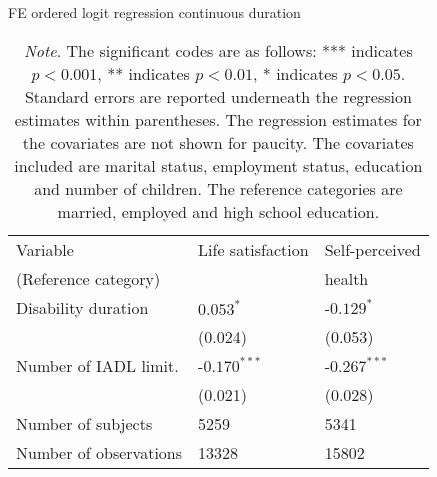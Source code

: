 \documentclass[12pt]{article}
\begin{document}
\begin{table}[htbp]
\centering
\footnotesize
\caption{FE ordered logit regression continuous duration}
\label{robust2}
\begin{tabular}{l ll}
\hline
Variable & Life satisfaction & Self-perceived \\
(Reference category) &  & health\\\hline\hline
\rule{0pt}{3ex}Disability duration      &  $0.053^{*}$   & -$0.129^{*}$     \\
                                        &  (0.024)       &  (0.053)         \\
\rule{0pt}{3ex}Number of IADL limit.    & -$0.170^{***}$ & -$0.267^{***}$   \\
                                        &  (0.021)       &  (0.028)         \\
\rule{0pt}{3ex}Number of subjects       &  5259          &  5341            \\
Number of observations                  &  13328         &  15802           \\
\hline
\end{tabular}
\caption*{\footnotesize{\textit{Note}. The significant codes are as follows: *** indicates $p < 0.001$, ** indicates $p < 0.01$, * indicates $p <0.05$. Standard errors are reported underneath the regression estimates within parentheses. The regression estimates for the covariates are not shown for paucity. The covariates included are marital status, employment status, education and number of children. The reference categories are married, employed and high school education.}}
\end{table}
\end{document}
